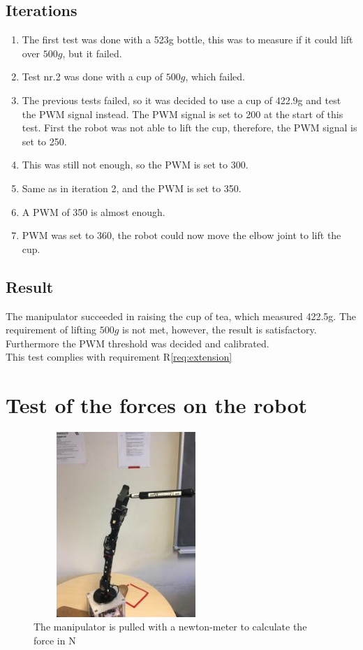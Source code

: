 \subsection*{Iterations}
\begin{enumerate}
    \item The first test was done with a 523g bottle, this was to measure if it could lift over $500g$, but it failed.
    \item Test nr.2 was done with a cup of $500g$, which failed. 
    \item The previous tests failed, so it was decided to use a cup of 422.9g and test the PWM signal instead. The PWM signal is set to 200 at the start of this test. First the robot was not able to lift the cup, therefore, the PWM signal is set to 250.
    \item This was still not enough, so the PWM is set to 300. 
    \item Same as in iteration 2, and the PWM is set to 350.
    \item A PWM of 350 is almost enough.
    \item PWM was set to 360, the robot could now move the elbow joint to lift the cup.
\end{enumerate}
\subsection*{Result}
The manipulator succeeded in raising the cup of tea, which measured 422.5g. The requirement of lifting $500g$ is not met, however, the result is satisfactory. Furthermore the PWM threshold was decided and calibrated.\\
This test complies with requirement R\ref{req:extension}
\newpage
\section{Test of the forces on the robot}
\begin{figure}[H]
    \centering
    \includegraphics[width=7cm,height=7cm]{Figures/Technical_figures/image5.jpg}
    \caption{The manipulator is pulled with a newton-meter to calculate the force in N}
    \label{fig:Nm}
\end{figure}
